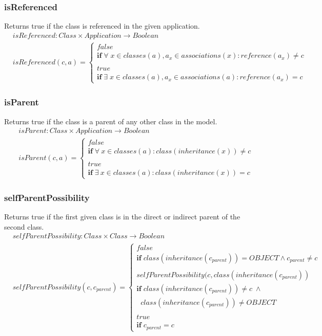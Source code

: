 \documentclass[10pt]{article}
\begin{document}
\subsubsection{isReferenced}
Returns true if the class is referenced in the given application.
\begin{align}
& isReferenced: Class \times Application \rightarrow Boolean \\
& isReferenced(c, a) = \begin{cases}
 false \\
 \mathbf{if} \; \forall \; x \in classes(a), a_x \in associations(x) : reference(a_x) \neq c \\ \\
 true \\
 \mathbf{if} \; \exists \; x \in classes(a), a_x \in associations(a) : reference(a_x) = c 
 \end{cases}
\end{align}

\subsubsection{isParent}
Returns true if the class is a parent of any other class in the model.
\begin{align}
& isParent: Class \times Application \rightarrow Boolean \\
& isParent(c, a) = \begin{cases}
 false \\
 \mathbf{if} \; \forall \: x \in classes(a) : class(inheritance(x)) \neq c \\\\
 true \\
  \mathbf{if} \; \exists \: x \in classes(a) : class(inheritance(x)) = c
 \end{cases}
\end{align}

\subsubsection{selfParentPossibility}
Returns true if the first given class is in the direct or indirect parent of the second class. 
\begin{align}
& selfParentPossibility: Class \times  Class \rightarrow Boolean \\
& selfParentPossibility(c, c_{parent}) = \begin{cases}
 false \\
 \mathbf{if} \; class(inheritance(c_{parent})) = OBJECT \land c_{parent} \neq c \\\\
 selfParentPossibility(c, class(inheritance(c_{parent}))\\
 \mathbf{if} \; class(inheritance(c_{parent})) \neq c \; \land  \\ \;\; class(inheritance(c_{parent})) \neq OBJECT \\\\
 true \\
 \mathbf{if} \; c_{parent} = c
 \end{cases}
\end{align}
\end{document}
